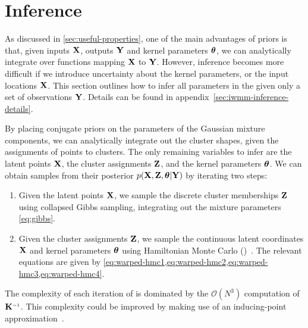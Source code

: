 \section{Inference}
\label{sec:iwmm-inference}

As discussed in \cref{sec:useful-properties}, one of the main advantages of \gp{} priors is that, given inputs $\mathbf{X}$, outputs $\mathbf{Y}$ and kernel parameters ${\boldsymbol{\theta}}$, we can analytically integrate over functions mapping $\mathbf{X}$ to $\mathbf{Y}$.
However, inference becomes more difficult if we introduce uncertainty about the kernel parameters, or the input locations $\mathbf{X}$.
This section outlines how to infer all parameters in the \iwmm{} given only a set of observations $\mathbf{Y}$.
Details can be found in appendix~\ref{sec:iwmm-inference-details}.

By placing conjugate priors on the parameters of the Gaussian mixture components, we can analytically integrate out the cluster shapes, given the assignments of points to clusters.
The only remaining variables to infer are the latent points $\mathbf{X}$, the cluster assignments $\mathbf{Z}$, and the kernel parameters ${\boldsymbol{\theta}}$.
%
%
We can obtain samples from their posterior 
$p(\mathbf{X},\mathbf{Z}, {\boldsymbol{\theta}} | \mathbf{Y})$ 
by iterating two steps:
\begin{enumerate}
\item
Given the latent points $\mathbf{X}$, we sample the discrete cluster memberships $\mathbf{Z}$ using collapsed Gibbs sampling, integrating out the mixture parameters \eqref{eq:gibbs}.
\item 
Given the cluster assignments $\mathbf{Z}$, we sample the continuous latent coordinates $\mathbf{X}$ and kernel parameters ${\boldsymbol{\theta}}$ using Hamiltonian Monte Carlo (\HMC{})~\citep[chapter 30]{mackay2003information}.
The relevant equations are given by \cref{eq:warped-hmc1,eq:warped-hmc2,eq:warped-hmc3,eq:warped-hmc4}.
\end{enumerate}

The complexity of each iteration of \HMC{} is dominated by the $\mathcal{O}(N^3)$ computation of $\vK\inv$.
This complexity could be improved by making use of an inducing-point approximation~\citep{quinonero2005unifying,snelson2006sparse}.



